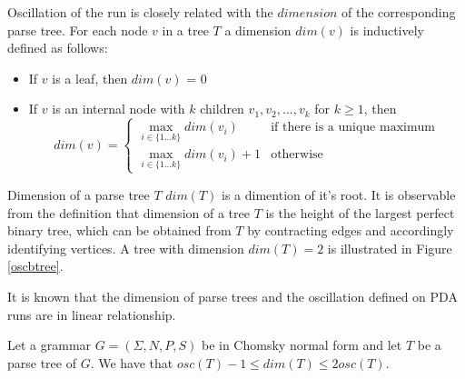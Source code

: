 Oscillation of the run is closely related with the $dimension$ of the corresponding parse tree. For each node $v$ in a tree $T$ a dimension $dim(v)$ is inductively defined as follows:
\begin{itemize}
\item If $v$ is a leaf, then $dim(v)$ = 0
\item If $v$ is an internal node with $k$ children $v_1, v_2, ..., v_k$ for $k \ge 1$, then 
$$
dim(v) = 
 \begin{cases}
   \max_{i \in \{1...k\}}dim(v_i) &\text{if there is a unique maximum}\\
   \max_{i \in \{1...k\}}dim(v_i)+1 &\text{otherwise}
 \end{cases}
$$
\end{itemize}


Dimension of a parse tree $T$ $dim(T)$ is a dimention of it's root.  It is observable from the definition that dimension of a tree $T$ is the height of the largest perfect binary tree, which can be obtained from $T$ by contracting edges and accordingly identifying vertices. A tree with dimension $dim(T) = 2$ is illustrated in Figure \ref{oscbtree}.


It is known that the dimension of parse trees and the oscillation defined on PDA runs are in linear relationship.

\begin{lemma}
Let a grammar $G = (\Sigma, N, P, S)$ be in Chomsky normal form and let $T$ be a parse tree of $G$. We have that $osc(T) - 1 \le dim(T) \le 2osc(T)$.
\end{lemma}

